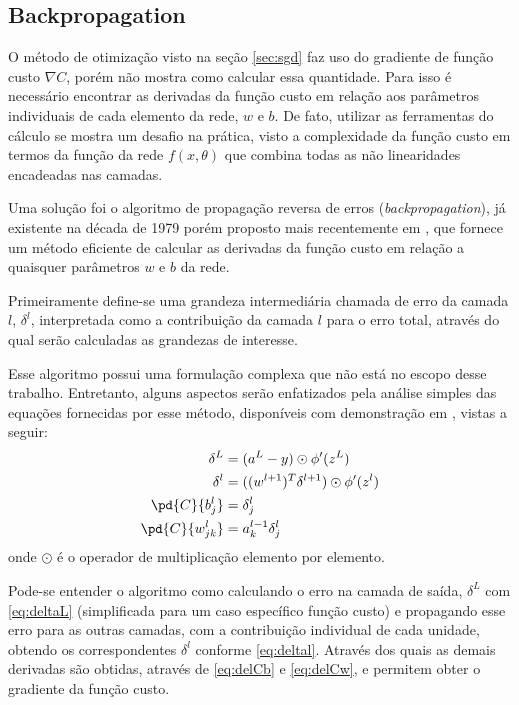 \subsection{Backpropagation}
\label{sub-sec:backprop}

O método de otimização visto na seção \ref{sec:sgd} faz uso do gradiente de função custo $\nabla C$, porém não mostra como calcular essa quantidade. Para isso é necessário encontrar as derivadas da função custo em relação aos parâmetros individuais de cada elemento da rede, $w$ e $b$. De fato, utilizar as ferramentas do cálculo se mostra um desafio na prática, visto a complexidade da função custo em termos da função da rede $f(x, \theta)$ que combina todas as não linearidades encadeadas nas camadas. 

Uma solução foi o algoritmo de propagação reversa de erros (\textit{backpropagation}), já existente na década de 1979 porém proposto mais recentemente em \cite{backpropagation}, que fornece um método eficiente de calcular as derivadas da função custo em relação a quaisquer parâmetros $w$ e $b$ da rede.

Primeiramente define-se uma grandeza intermediária chamada de erro da camada $l$, $\delta^l$, interpretada como a contribuição da camada $l$ para o erro total, através do qual serão calculadas as grandezas de interesse.

Esse algoritmo possui uma formulação complexa que não está no escopo desse trabalho. Entretanto, alguns aspectos serão enfatizados pela análise simples das equações fornecidas por esse método, disponíveis com demonstração em \cite{NeuralNetsDeep}, vistas a seguir:
\begin{align}
\delta^L &= (a^L - y) \odot \phi^\prime(z^L) \label{eq:deltaL} \\ 
\delta^l &= ((w^{l+1})^T\delta^{l+1}) \odot \phi^\prime(z^l) \label{eq:deltal}\\
\pd{C}{b_j^l{}} &= \delta_j^l \label{eq:delCb}\\ 
\pd{C}{w_{jk}^l{}} &= a_k^{l-1} \delta_j^l \label{eq:delCw}
\end{align}
onde $\odot$ é o operador de multiplicação elemento por elemento.

Pode-se entender o algoritmo como calculando o erro na camada de saída, $\delta^L$ com \eqref{eq:deltaL} (simplificada para um caso específico função custo) e propagando esse erro para as outras camadas, com a contribuição individual de cada unidade, obtendo os correspondentes $\delta^l$ conforme \eqref{eq:deltal}. Através dos quais as demais derivadas são obtidas, através de \eqref{eq:delCb} e \eqref{eq:delCw}, e permitem obter o gradiente da função custo. 


